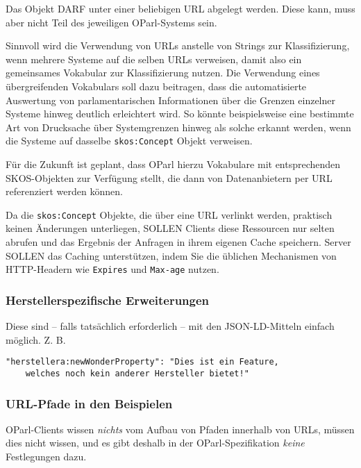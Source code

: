 \documentclass[,a4paper]{article}
\begin{document}
Das Objekt DARF unter einer beliebigen URL abgelegt werden. Diese kann,
muss aber nicht Teil des jeweiligen OParl-Systems sein.

Sinnvoll wird die Verwendung von URLs anstelle von Strings zur
Klassifizierung, wenn mehrere Systeme auf die selben URLs verweisen,
damit also ein gemeinsames Vokabular zur Klassifizierung nutzen. Die
Verwendung eines übergreifenden Vokabulars soll dazu beitragen, dass die
automatisierte Auswertung von parlamentarischen Informationen über die
Grenzen einzelner Systeme hinweg deutlich erleichtert wird. So könnte
beispielsweise eine bestimmte Art von Drucksache über Systemgrenzen
hinweg als solche erkannt werden, wenn die Systeme auf dasselbe
\texttt{skos:Concept} Objekt verweisen.

Für die Zukunft ist geplant, dass OParl hierzu Vokabulare mit
entsprechenden SKOS-Objekten zur Verfügung stellt, die dann von
Datenanbietern per URL referenziert werden können.

Da die \texttt{skos:Concept} Objekte, die über eine URL verlinkt werden,
praktisch keinen Änderungen unterliegen, SOLLEN Clients diese Ressourcen
nur selten abrufen und das Ergebnis der Anfragen in ihrem eigenen Cache
speichern. Server SOLLEN das Caching unterstützen, indem Sie die
üblichen Mechanismen von HTTP-Headern wie \texttt{Expires} und
\texttt{Max-age} nutzen.

\subsubsection{Herstellerspezifische
Erweiterungen}\label{herstellerspezifische-erweiterungen}

Diese sind -- falls tatsächlich erforderlich -- mit den JSON-LD-Mitteln
einfach möglich. Z. B.

\begin{verbatim}
"herstellera:newWonderProperty": "Dies ist ein Feature,
    welches noch kein anderer Hersteller bietet!"
\end{verbatim}

\subsubsection{URL-Pfade in den
Beispielen}\label{url-pfade-in-den-beispielen}

OParl-Clients wissen \emph{nichts} vom Aufbau von Pfaden innerhalb von
URLs, müssen dies nicht wissen, und es gibt deshalb in der
OParl-Spezifikation \emph{keine} Festlegungen dazu.
\end{document}
